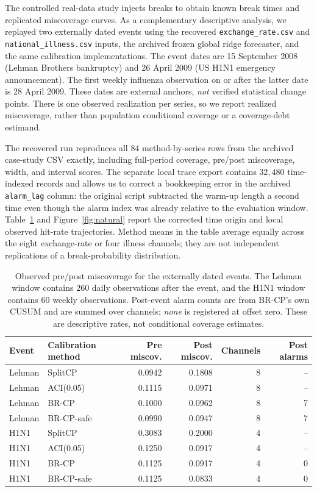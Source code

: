 \documentclass[10pt]{article}
\begin{document}
The controlled real-data study injects breaks to obtain known break times and replicated
miscoverage curves. As a complementary descriptive analysis, we replayed two externally
dated events using the recovered \texttt{exchange\_rate.csv} and
\texttt{national\_illness.csv} inputs, the archived frozen global ridge forecaster,
and the same calibration implementations. The event dates are 15 September 2008
(Lehman Brothers bankruptcy) and 26 April 2009 (US H1N1 emergency
announcement). The first weekly influenza observation on or after the latter
date is 28 April 2009. These dates are external anchors, \emph{not} verified
statistical change points. There is one observed realization per series, so
we report realized miscoverage, rather than population conditional coverage
or a coverage-debt estimand.

The recovered run reproduces all \(84\) method-by-series rows from the
archived case-study CSV exactly, including full-period coverage, pre/post
miscoverage, width, and interval scores. The separate local trace export
contains \(32{,}480\) time-indexed records and allows us to correct a
bookkeeping error in the archived \texttt{alarm\_lag} column: the original
script subtracted the warm-up length a second time even though the alarm
index was already relative to the evaluation window. Table~\ref{tab:natural}
and Figure~\ref{fig:natural} report the corrected time origin and local
observed hit-rate trajectories. Method means in the table average equally
across the eight exchange-rate or four illness channels; they are not
independent replications of a break-probability distribution.

\begin{table}[t]
\centering\small
\caption{Observed pre/post miscoverage for the externally dated events.
The Lehman window contains \(260\) daily observations after the event, and
the H1N1 window contains \(60\) weekly observations. Post-event alarm counts
are from BR-CP's own CUSUM and are summed over channels; \emph{none} is
registered at offset zero. These are descriptive rates, not conditional
coverage estimates.}
\label{tab:natural}
\begin{tabular}{llrrrr}
\toprule
Event & Calibration method & Pre miscov. & Post miscov. & Channels & Post alarms\\
\midrule
Lehman & SplitCP & 0.0942 & 0.1808 & 8 & --\\
Lehman & ACI(0.05) & 0.1115 & 0.0971 & 8 & --\\
Lehman & BR-CP & 0.1000 & 0.0962 & 8 & 7\\
Lehman & BR-CP-safe & 0.0990 & 0.0947 & 8 & 7\\
H1N1 & SplitCP & 0.3083 & 0.2000 & 4 & --\\
H1N1 & ACI(0.05) & 0.1250 & 0.0917 & 4 & --\\
H1N1 & BR-CP & 0.1125 & 0.0917 & 4 & 0\\
H1N1 & BR-CP-safe & 0.1125 & 0.0833 & 4 & 0\\
\bottomrule
\end{tabular}
\end{table}
\end{document}
